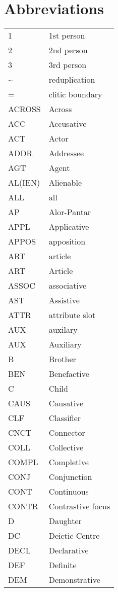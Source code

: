 \documentclass[a4paper]{article}
\title{}
\author{Marian}
\date{2014-01-08}
\begin{document}
\clearpage\setcounter{page}{1}\pagestyle{Standard}
\section{Abbreviations}
\begin{flushleft}
\tablehead{}
\begin{supertabular}{m{0.8788598in}m{4.33446in}}
1 &
1st person\\
2 &
2nd person\\
3 &
3rd person\\
\~{} &
reduplication\\
= &
clitic boundary\\
ACROSS &
Across\\
ACC &
Accusative\\
ACT &
Actor\\
ADDR &
Addressee\\
AGT &
Agent\\
AL(IEN) &
Alienable\\
ALL &
all\\
AP &
Alor-Pantar\\
APPL &
Applicative\\
APPOS &
apposition\\
ART &
article\\
ART &
Article\\
ASSOC &
associative\\
AST &
Assistive\\
ATTR &
attribute slot \\
AUX &
auxilary\\
AUX &
Auxiliary\\
B &
Brother\\
BEN &
Benefactive\\
C &
Child\\
CAUS &
Causative\\
CLF &
Classifier\\
CNCT &
Connector\\
COLL &
Collective\\
COMPL &
Completive\\
CONJ &
Conjunction\\
CONT &
Continuous\\
CONTR &
Contrastive focus\\
D &
Daughter\\
DC &
Deictic Centre\\
DECL &
Declarative\\
DEF &
Definite\\
DEM &
Demonstrative\\

\end{supertabular}
\end{flushleft}
\end{document}
